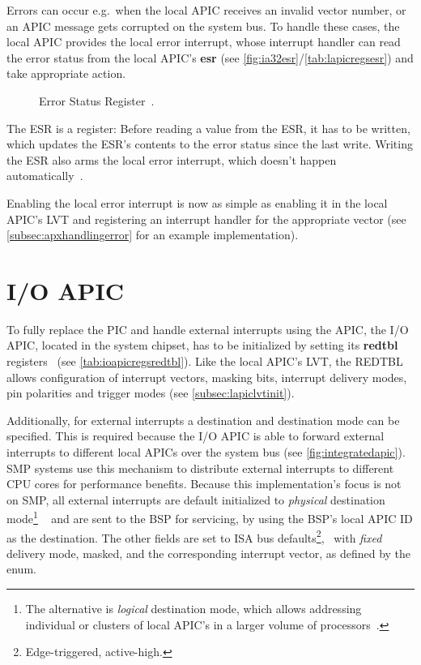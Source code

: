 Errors can occur e.g.\ when the local APIC receives an invalid vector number, or an APIC message gets corrupted on the system bus.
To handle these cases, the local APIC provides the local error interrupt, whose interrupt handler can read the error status from the local APIC's \textbf{\gls{esr}} (see \autoref{fig:ia32esr}/\autoref{tab:lapicregsesr}) and take appropriate action.

\begin{figure}[h]
  \centering
  \begin{subfigure}[b]{0.7\textwidth}
    
  \end{subfigure}
  \caption{Error Status Register~\autocite[sec.~3.11.5.3]{ia32}.}
  \label{fig:ia32esr}
\end{figure}

The ESR is a  register: Before reading a value from the ESR, it has to be written, which updates the ESR's contents to the error status since the last write.
Writing the ESR also arms the local error interrupt, which doesn't happen automatically~\autocite[sec.~3.11.5.3]{ia32}.

Enabling the local error interrupt is now as simple as enabling it in the local APIC's LVT and registering an interrupt handler for the appropriate vector (see \autoref{subsec:apxhandlingerror} for an example implementation).

\clearpage

\section{I/O APIC}
\label{sec:ioapicinit}

To fully replace the PIC and handle external interrupts using the APIC, the I/O APIC, located in the system chipset, has to be initialized by setting its \textbf{\gls{redtbl}} registers~\autocite[sec.~9.5.8]{ich5} (see \autoref{tab:ioapicregsredtbl}).
Like the local APIC's LVT, the REDTBL allows configuration of interrupt vectors, masking bits, interrupt delivery modes, pin polarities and trigger modes (see \autoref{subsec:lapiclvtinit}).

Additionally, for external interrupts a destination and destination mode can be specified.
This is required because the I/O APIC is able to forward external interrupts to different local APICs over the system bus (see \autoref{fig:integratedapic}).
SMP systems use this mechanism to distribute external interrupts to different CPU cores for performance benefits.
Because this implementation's focus is not on SMP, all external interrupts are default initialized to \textit{physical} destination mode\footnote{
  The alternative is \textit{logical} destination mode, which allows addressing individual or clusters of local APIC's in a larger volume of processors~\autocite[sec.~3.11.6.2.2]{ia32}.}
~\autocite[sec.~3.11.6.2.1]{ia32} and are sent to the BSP for servicing, by using the BSP's local APIC ID as the destination.
The other fields are set to ISA bus defaults\footnote{
  Edge-triggered, active-high.},
\ with \textit{fixed} delivery mode, masked, and the corresponding interrupt vector, as defined by the  enum.

